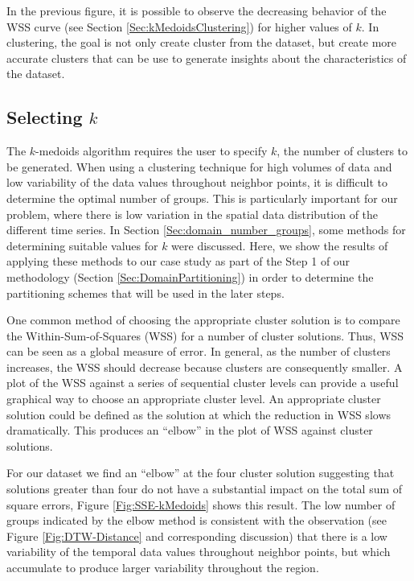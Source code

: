 In the previous figure, it is possible to observe the decreasing behavior of the WSS curve (see Section \ref{Sec:kMedoidsClustering}) for higher values of $k$. In clustering, the goal is not only create cluster from the dataset, but create more accurate clusters that can be use to generate insights about the characteristics of the dataset.

\subsection{Selecting $k$}
\label{Sec:Selectk}

The $k$-medoids algorithm requires the user to specify $k$, the number of clusters to be generated. When using a clustering technique for high volumes of data and low variability of the data values throughout neighbor points, it is difficult to determine the optimal number of groups. This is particularly important for our problem, where there is low variation in the spatial data distribution of the different time series. In Section \ref{Sec:domain_number_groups}, some methods for determining suitable values for $k$ were discussed. Here, we show the results of applying these methods to our case study as part of the Step 1 of our methodology (Section \ref{Sec:DomainPartitioning}) in order to determine the partitioning schemes that will be used in the later steps.

One common method of choosing the appropriate cluster solution is to compare the Within-Sum-of-Squares (WSS) for a number of cluster solutions. Thus, WSS can be seen as a global measure of error. In general, as the number of clusters increases, the WSS should decrease because clusters are consequently smaller. A plot of the WSS against a series of sequential cluster levels can provide a useful graphical way to choose an appropriate cluster level. An appropriate cluster solution could be defined as the solution at which the reduction in WSS slows dramatically. This produces an ``elbow'' in the plot of WSS against cluster solutions. 

For our dataset we find an ``elbow'' at the four cluster solution suggesting that solutions greater than four do not have a substantial impact on the total sum of square errors, Figure \ref{Fig:SSE-kMedoids} shows this result. The low number of groups indicated by the elbow method is consistent with the observation (see Figure \ref{Fig:DTW-Distance} and corresponding discussion) that there is a low variability of the temporal data values throughout neighbor points, but which accumulate to produce larger variability throughout the region.


